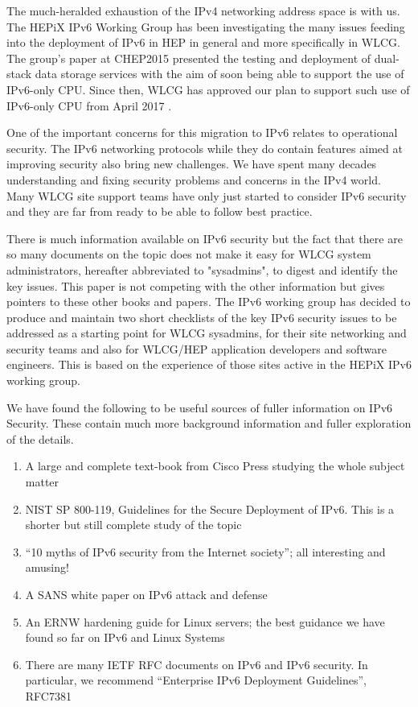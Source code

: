 
The much-heralded exhaustion of the IPv4 networking address space is with us. The HEPiX
IPv6 Working Group \cite{ipv6wg} has been investigating the many issues feeding into the deployment of IPv6 in HEP in general and more specifically in WLCG. The group's paper at CHEP2015 \cite{ipv6chep2015} presented the testing and deployment of dual-stack data storage services with the aim of soon being able to support the use of IPv6-only CPU. Since then, WLCG has approved our plan to support such use of IPv6-only CPU from April 2017 \cite{ipv6chep2016}.

One of the important concerns for this migration to IPv6 relates to operational security. The IPv6 networking protocols while they do contain features aimed at improving security also bring new challenges. We have spent many decades understanding and fixing security problems and concerns in the IPv4 world. Many WLCG site support teams have only just started to consider IPv6 security and they are far from ready to be able to follow best practice. 

There is much information available on IPv6 security but the fact that there are so many documents on the topic does not make it easy for WLCG system administrators, hereafter abbreviated to "sysadmins", to digest and identify the key issues. This paper is not competing with the other information but gives pointers to these other books and papers. The IPv6 working group has decided to produce and maintain two short checklists of the key IPv6 security issues to be addressed as a starting point for WLCG sysadmins, for their site networking and security teams and also for WLCG/HEP application developers and software engineers. This is based on the experience of those sites active in the HEPiX IPv6 working group.

We have found the following to be useful sources of fuller information on IPv6 Security. These contain much more background information and fuller exploration of the details.

\begin {enumerate}
\item A large and complete text-book from Cisco Press studying the whole subject matter \cite {CiscoBook}
\item NIST SP 800-119, Guidelines for the Secure Deployment of IPv6. This is a shorter but still complete study of the topic \cite{nist800-119}
\item ``10 myths of IPv6 security from the Internet society''; all interesting and amusing! \cite{10myths}
\item A SANS white paper on IPv6 attack and defense \cite {SANSipv6}
\item An ERNW hardening guide for Linux servers; the best guidance we have found so far on IPv6 and Linux Systems \cite {ERNWipv6}
\item There are many IETF RFC documents on IPv6 and IPv6 security. In particular, we recommend ``Enterprise IPv6 Deployment Guidelines'', RFC7381 \cite{rfc}
\end {enumerate}

